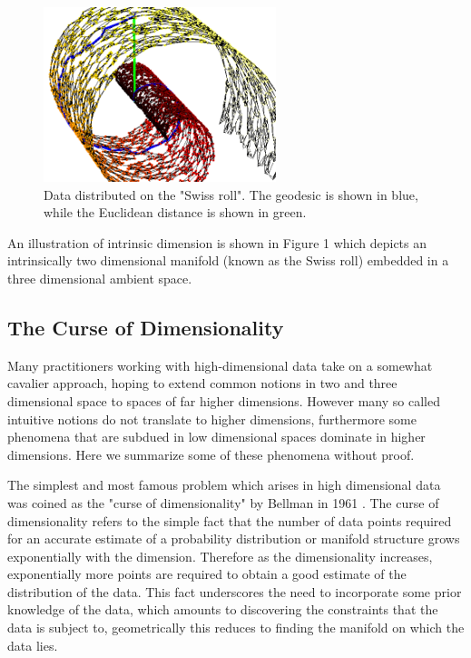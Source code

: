\documentclass[12pt,a4paper]{article}
\begin{document}
\begin{figure}[h]
\centering
\includegraphics[height=2in]{swiss.png}
\caption{ \small {Data distributed on the "Swiss roll". The geodesic is shown in blue, while the Euclidean distance is shown in green.}}  
\end{figure}
\noindent
An illustration of intrinsic dimension is shown in Figure 1 which depicts an intrinsically two dimensional manifold (known as the Swiss roll) embedded in a three dimensional ambient space.   

\subsection{The Curse of Dimensionality}

	\hspace{5mm} Many practitioners working with high-dimensional data take on a somewhat cavalier approach, hoping to extend common notions in two and three dimensional space to spaces of far higher dimensions. However many so called intuitive notions do not translate to higher dimensions, furthermore some phenomena that are subdued in low dimensional spaces dominate in higher dimensions. Here we summarize some of these phenomena without proof.

The simplest and most famous problem which arises in high dimensional data was coined as the "curse of dimensionality" by Bellman in 1961 \cite{ManLearn}. The curse of dimensionality refers to the simple fact that the number of data points required for an accurate estimate of a probability distribution or manifold structure grows exponentially with the dimension. Therefore as the dimensionality increases, exponentially more points are required to obtain a good estimate of the distribution of the data. This fact underscores the need to incorporate some prior knowledge of the data, which amounts to discovering the constraints that the data is subject to, geometrically this reduces to finding the manifold on which the data lies.  
\end{document}
